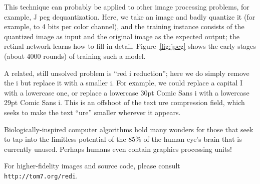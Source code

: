 \documentclass[twocolumn]{article}
\begin{document}
This technique can probably be applied to other image processing
problems, for example, J peg dequantization. Here, we take an image
and badly quantize it (for example, to 4 bits per color channel), and
the training instance consists of the quantized image as input and the
original image as the expected output; the retinal network learns how
to fill in detail. Figure~\ref{fig:jpeg} shows the early stages (about
4000 rounds) of training such a model.

A related, still unsolved problem is ``red i reduction''; here we do
simply remove the i but replace it with a smaller i. For example, we
could replace a capital I with a lowercase one, or replace a lowercase
30pt Comic Sans i with a lowercase 29pt Comic Sans i. This is an
offshoot of the text ure compression field, which seeks to make the
text ``ure'' smaller wherever it appears.

\medskip
Biologically-inspired computer algorithms hold many wonders for those
that seek to tap into the limitless potential of the 85\% of the human
eye's brain that is currently unused. Perhaps humans even contain
graphics processing units!

\bigskip
For higher-fidelity images and source code, please consult {\tt
http://tom7.org/redi}.
\end{document}
